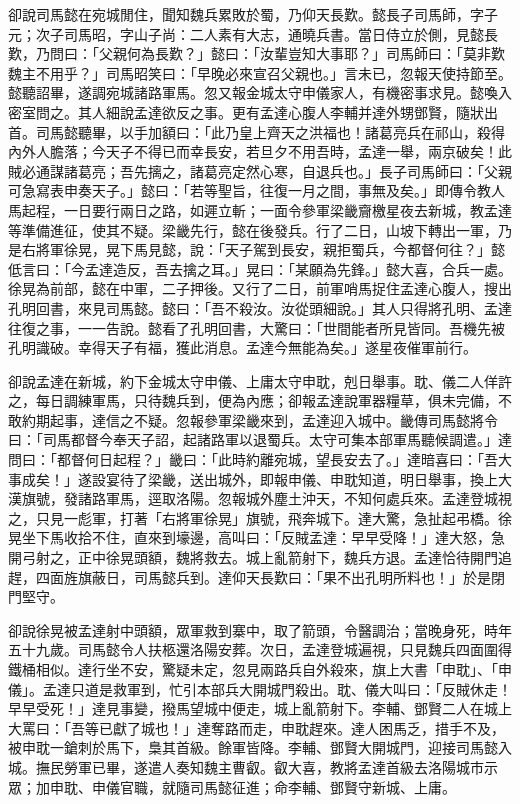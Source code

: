 卻說司馬懿在宛城閒住，聞知魏兵累敗於蜀，乃仰天長歎。懿長子司馬師，字子元；次子司馬昭，字山子尚：二人素有大志，通曉兵書。當日侍立於側，見懿長歎，乃問曰：「父親何為長歎？」懿曰：「汝輩豈知大事耶？」司馬師曰：「莫非歎魏主不用乎？」司馬昭笑曰：「早晚必來宣召父親也。」言未已，忽報天使持節至。懿聽詔畢，遂調宛城諸路軍馬。忽又報金城太守申儀家人，有機密事求見。懿喚入密室問之。其人細說孟達欲反之事。更有孟達心腹人李輔并達外甥鄧賢，隨狀出首。司馬懿聽畢，以手加額曰：「此乃皇上齊天之洪福也！諸葛亮兵在祁山，殺得內外人膽落；今天子不得已而幸長安，若旦夕不用吾時，孟達一舉，兩京破矣！此賊必通謀諸葛亮；吾先摛之，諸葛亮定然心寒，自退兵也。」長子司馬師曰：「父親可急寫表申奏天子。」懿曰：「若等聖旨，往復一月之間，事無及矣。」即傳令教人馬起程，一日要行兩日之路，如遲立斬；一面令參軍梁畿齎檄星夜去新城，教孟達等準備進征，使其不疑。梁畿先行，懿在後發兵。行了二日，山坡下轉出一軍，乃是右將軍徐晃，晃下馬見懿，說：「天子駕到長安，親拒蜀兵，今都督何往？」懿低言曰：「今孟達造反，吾去擒之耳。」晃曰：「某願為先鋒。」懿大喜，合兵一處。徐晃為前部，懿在中軍，二子押後。又行了二日，前軍哨馬捉住孟達心腹人，搜出孔明回書，來見司馬懿。懿曰：「吾不殺汝。汝從頭細說。」其人只得將孔明、孟達往復之事，一一告說。懿看了孔明回書，大驚曰：「世間能者所見皆同。吾機先被孔明識破。幸得天子有福，獲此消息。孟達今無能為矣。」遂星夜催軍前行。

卻說孟達在新城，約下金城太守申儀、上庸太守申耽，剋日舉事。耽、儀二人佯許之，每日調練軍馬，只待魏兵到，便為內應；卻報孟達說軍器糧草，俱未完備，不敢約期起事，達信之不疑。忽報參軍梁畿來到，孟達迎入城中。畿傳司馬懿將令曰：「司馬都督今奉天子詔，起諸路軍以退蜀兵。太守可集本部軍馬聽候調遣。」達問曰：「都督何日起程？」畿曰：「此時約離宛城，望長安去了。」達暗喜曰：「吾大事成矣！」遂設宴待了梁畿，送出城外，即報申儀、申耽知道，明日舉事，換上大漢旗號，發諸路軍馬，逕取洛陽。忽報城外塵土沖天，不知何處兵來。孟達登城視之，只見一彪軍，打著「右將軍徐晃」旗號，飛奔城下。達大驚，急扯起弔橋。徐晃坐下馬收拾不住，直來到壕邊，高叫曰：「反賊孟達：早早受降！」達大怒，急開弓射之，正中徐晃頭額，魏將救去。城上亂箭射下，魏兵方退。孟達恰待開門追趕，四面旌旗蔽日，司馬懿兵到。達仰天長歎曰：「果不出孔明所料也！」於是閉門堅守。

卻說徐晃被孟達射中頭額，眾軍救到寨中，取了箭頭，令醫調治；當晚身死，時年五十九歲。司馬懿令人扶柩還洛陽安葬。次日，孟達登城遍視，只見魏兵四面圍得鐵桶相似。達行坐不安，驚疑未定，忽見兩路兵自外殺來，旗上大書「申耽」、「申儀」。孟達只道是救軍到，忙引本部兵大開城門殺出。耽、儀大叫曰：「反賊休走！早早受死！」達見事變，撥馬望城中便走，城上亂箭射下。李輔、鄧賢二人在城上大罵曰：「吾等已獻了城也！」達奪路而走，申耽趕來。達人困馬乏，措手不及，被申耽一鎗刺於馬下，梟其首級。餘軍皆降。李輔、鄧賢大開城門，迎接司馬懿入城。撫民勞軍已畢，遂遣人奏知魏主曹叡。叡大喜，教將孟達首級去洛陽城市示眾；加申耽、申儀官職，就隨司馬懿征進；命李輔、鄧賢守新城、上庸。


